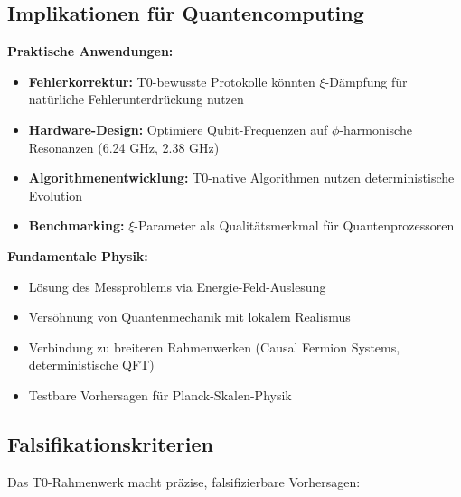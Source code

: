 \subsection{Implikationen für Quantencomputing}

\textbf{Praktische Anwendungen:}
\begin{itemize}
	\item \textbf{Fehlerkorrektur:} T0-bewusste Protokolle könnten $\xi$-Dämpfung für natürliche Fehlerunterdrückung nutzen
	\item \textbf{Hardware-Design:} Optimiere Qubit-Frequenzen auf $\phi$-harmonische Resonanzen (6.24 GHz, 2.38 GHz)
	\item \textbf{Algorithmenentwicklung:} T0-native Algorithmen nutzen deterministische Evolution
	\item \textbf{Benchmarking:} $\xi$-Parameter als Qualitätsmerkmal für Quantenprozessoren
\end{itemize}

\textbf{Fundamentale Physik:}
\begin{itemize}
	\item Lösung des Messproblems via Energie-Feld-Auslesung
	\item Versöhnung von Quantenmechanik mit lokalem Realismus
	\item Verbindung zu breiteren Rahmenwerken (Causal Fermion Systems, deterministische QFT)
	\item Testbare Vorhersagen für Planck-Skalen-Physik
\end{itemize}

\subsection{Falsifikationskriterien}

Das T0-Rahmenwerk macht präzise, falsifizierbare Vorhersagen:


